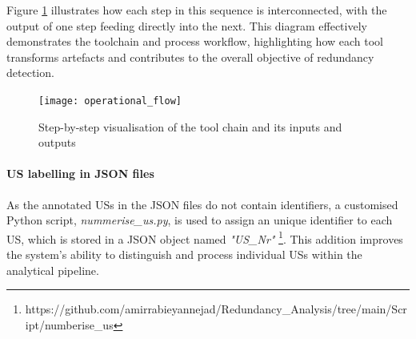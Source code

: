 Figure \ref{fig:operational_flow} illustrates how each step in this sequence is interconnected, with the output of one step feeding directly into the next. This diagram effectively demonstrates the toolchain and process workflow, highlighting how each tool transforms artefacts and contributes to the overall objective of redundancy detection.
\begin{figure}[h]
	\centering 
	\texttt{[image: operational\_flow]}
	\caption{Step-by-step visualisation of the tool chain and its inputs and outputs}\label{fig:operational_flow}
\end{figure}
\paragraph{US labelling in JSON files}\label{workflow_nummerize_us}
As the annotated USs in the JSON files do not contain identifiers, a customised Python script, \textit{nummerise\_us.py}, is used to assign an unique identifier to each US, which is stored in a JSON object named \textit{"US\_Nr"} \footnote{https://github.com/amirrabieyannejad/Redundancy\_Analysis/tree/main/Script/numberise\_us}. This addition improves the system's ability to distinguish and process individual USs within the analytical pipeline.

